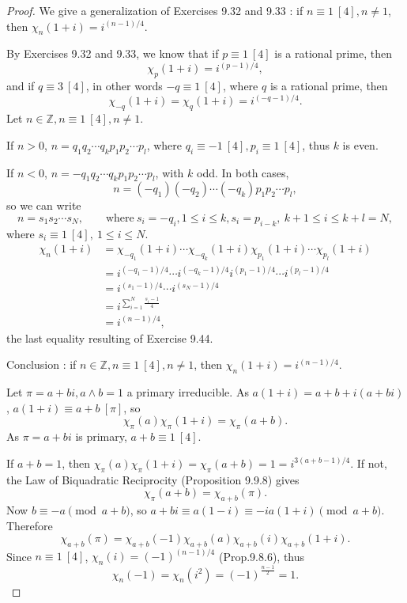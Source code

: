 \documentclass[11pt,a4paper]{article}
\begin{document}
\begin{proof}
We give a generalization of Exercises 9.32 and 9.33 : if $n\equiv1\ [4], n \neq 1$, then $\chi_n(1+i) = i^{(n-1)/4}$.

By Exercises 9.32 and 9.33, we know that if  $p\equiv 1\ [4]$ is a rational prime, then 
$$\chi_p(1+i) = i^{(p-1)/4},$$
and if $q \equiv 3 \ [4]$, in other words $-q \equiv 1 \ [4]$, where $q$ is a rational prime, then
$$\chi_{-q}(1+i) =  \chi_{q}(1+i) = i^{(-q-1)/4}.$$
Let  $n \in \mathbb{Z}, n\equiv 1 \ [4],n\neq 1$.

If $n>0$, $n = q_1q_2\cdots q_kp_1p_2\cdots p_l$, where $q_i \equiv -1 \ [4], p_i \equiv 1 \ [4]$, thus $k$ is even.

If $n<0$, $n = -q_1q_2\cdots q_kp_1p_2\cdots p_l$, with $k$ odd.
In both cases, 
$$n = (-q_1)(-q_2)\cdots(-q_k)p_1p_2\cdots p_l,$$
so we can write
$$n = s_1s_2\cdots s_N, \qquad \mathrm{where}\ s_i = -q_i, 1\leq i \leq k, s_i = p_{i-k}, \ k+1 \leq i \leq k+l = N,$$
where $s_i\equiv 1 \ [4], \ 1 \leq i \leq N$.
\begin{align*}
\chi_n(1+i)&=  \chi_{-q_1}(1+i)\cdots\chi_{-q_k}(1+i)\chi_{p_1}(1+i)\cdots\chi_{p_l}(1+i)\\
&=i^{(-q_1-1)/4}\cdots i^{(-q_k-1)/4}  i^{(p_1-1)/4} \cdots i^{(p_l-1)/4} \\
&=i^{(s_1-1)/4}\cdots  i^{(s_N-1)/4} \\
&=i^{\sum_{i=1}^N \frac{s_i-1}{4}}\\
&=i^{(n-1)/4},
\end{align*}
the last equality resulting of Exercise 9.44.

Conclusion : if $n \in \mathbb{Z}, n\equiv1\ [4], n \neq 1$, then $\chi_n(1+i)=i^{(n-1)/4}$.

\bigskip

Let $\pi = a+bi, a\wedge b=1$ a primary irreducible. As $a(1+i) = a+b + i(a+bi)$, $a(1+i) \equiv a+b \ [\pi]$, so
$$\chi_{\pi}(a) \chi_{\pi}(1+i) = \chi_{\pi}(a+b).$$
As $\pi =a +bi$ is primary, $a+b \equiv 1 \ [4]$.

If $a+b = 1$, then $\chi_{\pi}(a) \chi_{\pi}(1+i) = \chi_{\pi}(a+b)=1 = i^{3(a+b-1)/4}$. If not, the Law of Biquadratic Reciprocity (Proposition 9.9.8) gives
$$\chi_\pi(a+b) = \chi_{a+b}(\pi).$$
Now $b \equiv -a\pmod{a+b}$, so $ a + bi \equiv a(1-i) \equiv -i a (1+i) \pmod{a+b}$. Therefore
$$\chi_{a+b}(\pi) = \chi_{a+b}(-1) \chi_{a+b}(a) \chi_{a+b}(i) \chi_{a+b}(1+i).$$
Since $n\equiv 1 \ [4]$, $\chi_n(i) = (-1)^{(n-1)/4}$ (Prop.9.8.6), thus $$\chi_n(-1) = \chi_n(i^2) = (-1)^{\frac{n-1}{2}}=1.$$


\end{proof}
\end{document}
